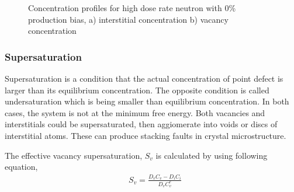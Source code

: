 \documentclass[a4paper]{article}
\begin{document}
\begin{figure}[htb!]
      \caption{Concentration profiles for high dose rate neutron with 0\% production bias, a) interstitial concentration b) vacancy concentration}
      \label{figure:concentrations_neutron_5_1e-3}
    \end{figure}

    \newpage
    \subsubsection{Supersaturation} \hspace{10pt}
    Supersaturation is a condition that the actual concentration of point defect is larger than its equilibrium concentration. The opposite condition is called undersaturation which is being smaller than equilibrium concentration. In both cases, the system is not at the minimum free energy. Both vacancies and interstitials could be supersaturated, then aggiomerate into voids or discs of interstitial atoms. These can produce stacking faults in crystal microstructure.

    The effective vacancy supersaturation, ${S_v}$ is calculated by using following equation, \cite{was2016}\\

    \begin{equation}
      \begin{aligned}
        &S_v=\frac{D_vC_v-D_iC_i}{D_vC_v^e}\\
      \end{aligned}
    \end{equation}\\
\end{document}
